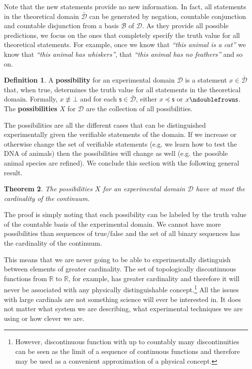 \documentclass[letterpaper]{article}
\theoremstyle{plain}%
\newtheorem{thrm}{Theorem}[section]
\theoremstyle{definition}
\newtheorem{defn}[thrm]{Definition}
\theoremstyle{remark}
\numberwithin{equation}{section}
\def\contradiction{\bot}
\def\ncomp{\ndoublefrown}
\def\narrower{\preccurlyeq}
\newcommand{\edomain}[1][D] {\mathcal{#1}}
\newcommand{\tdomain}[1][D] {\bar{\mathcal{#1}}}
\newcommand{\basis}[1][B] {\mathcal{#1}} %
\newcommand{\statement}[1] {\emph{``#1''}}
\begin{document}
Note that the new statements provide no new information. In fact, all statements in the theoretical domain $\tdomain$ can be generated by negation, countable conjunction and countable disjunction from a basis $\basis$ of $\edomain$. As they provide all possible predictions, we focus on the ones that completely specify the truth value for all theoretical statements. For example, once we know that \statement{this animal is a cat} we know that \statement{this animal has whiskers}, that \statement{this animal has no feathers} and so on.

\begin{defn}
	A \textbf{possibility} for an experimental domain $\edomain$ is a statement $x \in \tdomain$ that, when true, determines the truth value for all statements in the theoretical domain. Formally, $x \nequiv \contradiction$ and for each $\mathsf{s} \in \tdomain$, either $x \narrower \mathsf{s}$ or $x \ncomp \mathsf{s}$. The \textbf{possibilities} $X$ for $\edomain$ are the collection of all possibilities.
\end{defn}

The possibilities are all the different cases that can be distinguished experimentally given the verifiable statements of the domain. If we increase or otherwise change the set of verifiable statements (e.g. we learn how to test the DNA of animals) then the possibilities will change as well (e.g. the possible animal species are refined). We conclude this section with the following general result.

\begin{thrm}
	The possibilities $X$ for an experimental domain $\edomain$ have at most the cardinality of the continuum.
\end{thrm}

The proof is simply noting that each possibility can be labeled by the truth value of the countable basis of the experimental domain. We cannot have more possibilities than sequences of true/false and the set of all binary sequences has the cardinality of the continuum.

This means that we are never going to be able to experimentally distinguish between elements of greater cardinality. The set of topologically discontinuous functions from $\mathbb{R}$ to $\mathbb{R}$, for example, has greater cardinality and therefore it will never be associated with any physically distinguishable concept.\footnote{However, discontinuous function with up to countably many discontinuities can be seen as the limit of a sequence of continuous functions and therefore may be used as a convenient approximation of a physical concept.} All the issues with large cardinals are not something science will ever be interested in. It does not matter what system we are describing, what experimental techniques we are using or how clever we are.
\end{document}
